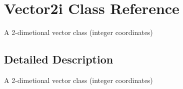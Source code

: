 \hypertarget{class_vector2i}{\section{Vector2i Class Reference}
\label{class_vector2i}
}


A 2-\/dimetional vector class (integer coordinates)  




\subsection{Detailed Description}
A 2-\/dimetional vector class (integer coordinates) 